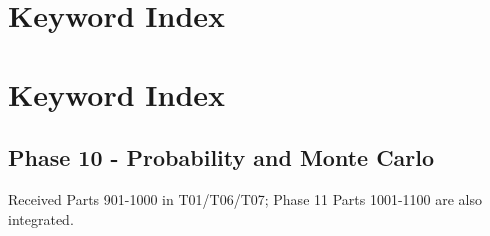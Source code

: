 \hypertarget{appendix-a6d556a4ef50}{}
\section*{Keyword Index}
\section{Keyword Index}\label{keyword-index}

\subsection{Phase 10 - Probability and Monte Carlo}\label{phase-10---probability-and-monte-carlo}

Received Parts 901-1000 in T01/T06/T07; Phase 11 Parts 1001-1100 are also integrated.

